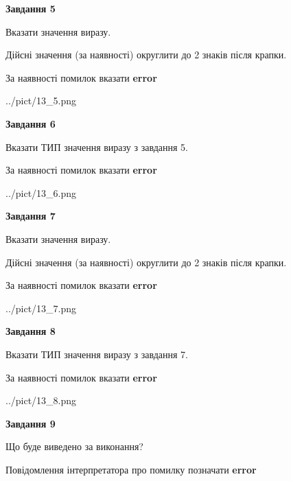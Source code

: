 \documentclass[11pt, ukrainian]{article}
\begin{document}
{\begin {large}
{\begin {center}\textbf{Завдання 5}\end {center}}\par
Вказати значення виразу. \par
Дійсні значення (за наявності) округлити до 2 знаків після крапки. \par
За наявності помилок вказати \textbf{error}

\begin{center}
	{../pict/13_5.png}
\end{center}
\newpage

{\begin {center}\textbf{Завдання 6}\end {center}}\par
Вказати ТИП значення виразу з завдання 5. \par
За наявності помилок вказати \textbf{error}

\begin{center}
	{../pict/13_6.png}
\end{center}
\newpage

{\begin {center}\textbf{Завдання 7}\end {center}}\par
Вказати значення виразу. \par
Дійсні значення (за наявності) округлити до 2 знаків після крапки. \par
За наявності помилок вказати \textbf{error}

\begin{center}
	{../pict/13_7.png}
\end{center}
\newpage

{\begin {center}\textbf{Завдання 8}\end {center}}\par
Вказати ТИП значення виразу з завдання 7. \par
За наявності помилок вказати \textbf{error}

\begin{center}
	{../pict/13_8.png}
\end{center}
\newpage

{\begin {center}\textbf{Завдання 9}\end {center}}\par
Що буде виведено за виконання? \par
Повідомлення інтерпретатора про помилку позначати \textbf{error}


\end{large}}
\end{document}
